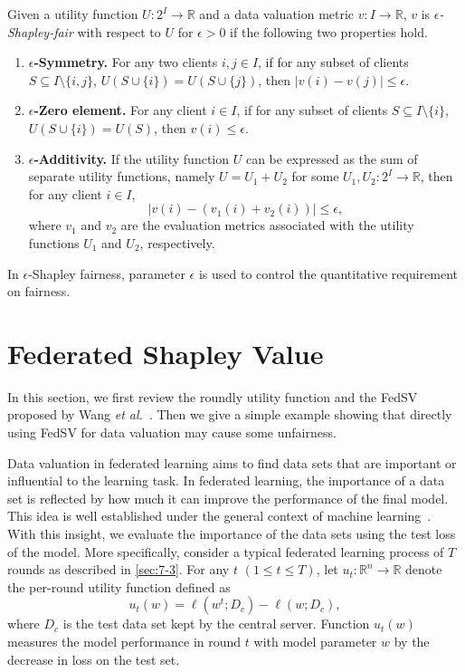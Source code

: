 \begin{definition} \label{def:hfl_fairness}
    Given a utility function $U:2^I \to \mathbb{R}$ and a data valuation metric $v: I \to \mathbb{R}$, $v$ is \emph{$\epsilon$-Shapley-fair} with respect to $U$ for $\epsilon > 0$ if the following two properties hold.
    \begin{enumerate}
    \item \textbf{$\epsilon$-Symmetry.} For any two clients $i, j \in I$, if for any subset of clients $S \subseteq I \setminus \{i,j\}$, $U(S \cup \{i\}) = U(S \cup \{j\})$, then $|v(i) - v(j)| \leq \epsilon$. 
    \item \textbf{$\epsilon$-Zero element.} For any client $i \in I$, if for any subset of clients $S \subseteq I \setminus \{i\}$, $U(S \cup \{i\}) = U(S)$, then $v(i) \leq \epsilon$.
    \item \textbf{$\epsilon$-Additivity.} If the utility function $U$ can be expressed as the sum of separate utility functions, namely $U = U_1 + U_2$ for some $U_1, U_2 : 2^I \to \mathbb{R}$, then for any client $i \in I$, 
    \[|v(i) - (v_1(i)  + v_2(i))| \leq \epsilon,\]
    where $v_1$ and $v_2$ are the evaluation metrics associated with the utility functions $U_1$ and $U_2$, respectively. 
\end{enumerate}
\end{definition}
In $\epsilon$-Shapley fairness, parameter $\epsilon$ is used to control the quantitative requirement on fairness. 

\section{Federated Shapley Value} \label{sec:7-5}

In this section, we first review the roundly utility function and the FedSV proposed by Wang \textit{et al.}~\cite{wang2020principled}. Then we give a simple example showing that directly using FedSV for data valuation may cause some unfairness. 

Data valuation in federated learning aims to find data sets that are important or influential to the learning task. In federated learning, the importance of a data set is reflected by how much it can improve the performance of the final model. This idea is well established under the general context of machine learning~\cite{ghorbani2019data}. With this insight, we evaluate the importance of the data sets using the test loss of the model. More specifically, consider a typical federated learning process of $T$ rounds as described in \autoref{sec:7-3}. For any $t$ $(1 \leq t \leq T)$, let $u_t: \mathbb{R}^n \to \mathbb{R}$ denote the per-round utility function defined as
\begin{equation} \label{eq:utility}
    u_t(w) = \ell(w^t; D_c) - \ell(w; D_c),
\end{equation}
where $D_c$ is the test data set kept by the central server. Function $u_t(w)$ measures the model performance in round $t$ with model parameter $w$ by the decrease in loss on the test set. 

